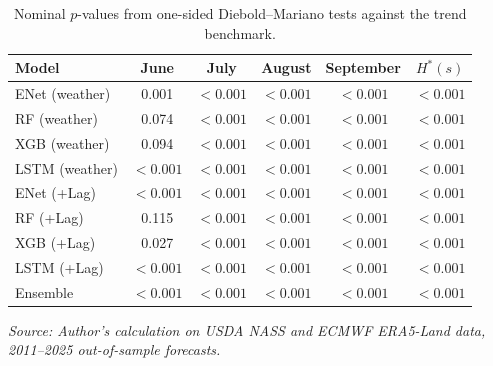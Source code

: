 \begin{table}[htbp]
\centering\singlespacing\footnotesize
\color{red}
\setlength{\tabcolsep}{3pt}
\renewcommand{\arraystretch}{1.12}
\caption{Nominal $p$-values from one-sided Diebold--Mariano tests against the trend benchmark.}
\label{tab:forecast_inference}
\begin{tabular*}{\textwidth}{@{\extracolsep{\fill}}lccccc@{}}
\toprule
Model & June & July & August & September & $H^*(s)$ \\
\midrule
ENet (weather) & 0.001 & $<0.001$ & $<0.001$ & $<0.001$ & $<0.001$ \\
RF (weather) & 0.074 & $<0.001$ & $<0.001$ & $<0.001$ & $<0.001$ \\
XGB (weather) & 0.094 & $<0.001$ & $<0.001$ & $<0.001$ & $<0.001$ \\
LSTM (weather) & $<0.001$ & $<0.001$ & $<0.001$ & $<0.001$ & $<0.001$ \\
ENet (+Lag) & $<0.001$ & $<0.001$ & $<0.001$ & $<0.001$ & $<0.001$ \\
RF (+Lag) & 0.115 & $<0.001$ & $<0.001$ & $<0.001$ & $<0.001$ \\
XGB (+Lag) & 0.027 & $<0.001$ & $<0.001$ & $<0.001$ & $<0.001$ \\
LSTM (+Lag) & $<0.001$ & $<0.001$ & $<0.001$ & $<0.001$ & $<0.001$ \\
Ensemble & $<0.001$ & $<0.001$ & $<0.001$ & $<0.001$ & $<0.001$ \\
\bottomrule
\end{tabular*}
\vspace{0.3em}
{\footnotesize\textit{Source: Author's calculation on USDA NASS and ECMWF ERA5-Land data, 2011--2025 out-of-sample forecasts.} }
\end{table}
